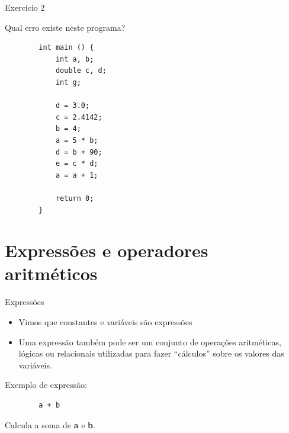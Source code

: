 \documentclass[handout]{beamer}
\begin{document}
\begin{frame}[fragile]{Exercício 2}

    Qual erro existe neste programa?

    \begin{verbatim}
        int main () {
            int a, b;
            double c, d;
            int g;

            d = 3.0;
            c = 2.4142;
            b = 4;
            a = 5 * b;
            d = b + 90;
            e = c * d;
            a = a + 1;

            return 0;
        }
    \end{verbatim}
\end{frame}


\section{Expressões e operadores aritméticos}

\begin{frame}[fragile]{Expressões}

    \begin{itemize}[<+->]
        \item Vimos que constantes e variáveis são expressões
        \item Uma expressão também pode ser um conjunto de operações aritméticas, lógicas ou relacionais utilizadas para fazer ``cálculos'' sobre os valores das variáveis.
    \end{itemize}

    \pause
    Exemplo de expressão:

    \begin{verbatim}
        a + b
    \end{verbatim}
    Calcula a soma de {\bf a} e {\bf b}.

\end{frame}

\end{document}
